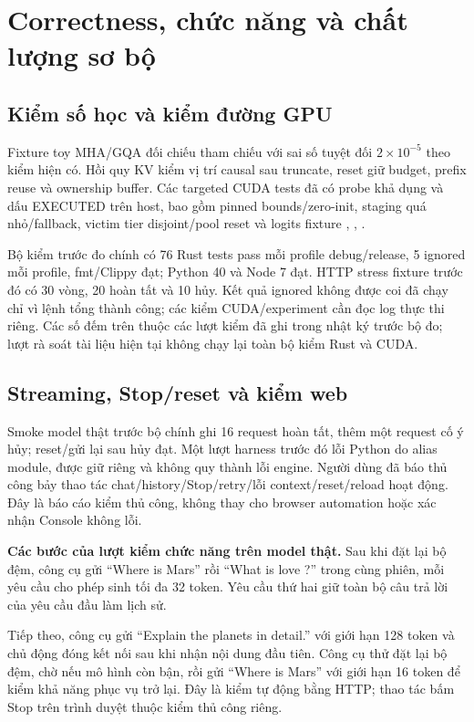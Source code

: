 \section{Correctness, chức năng và chất lượng sơ bộ}

\subsection{Kiểm số học và kiểm đường GPU}

Fixture toy MHA/GQA đối chiếu tham chiếu với sai số tuyệt đối $2\times10^{-5}$ theo kiểm hiện có. Hồi quy KV kiểm vị trí causal sau truncate, reset giữ budget, prefix reuse và ownership buffer. Các targeted CUDA tests đã có probe khả dụng và dấu EXECUTED trên host, bao gồm pinned bounds/zero-init, staging quá nhỏ/fallback, victim tier disjoint/pool reset và logits fixture \cite{moe_tierengine_arch}, \cite{exp_ram_guard_i5}, \cite{moe_progress_matrix}.

Bộ kiểm trước đo chính có 76 Rust tests pass mỗi profile debug/release, 5 ignored mỗi profile, fmt/Clippy đạt; Python 40 và Node 7 đạt. HTTP stress fixture trước đó có 30 vòng, 20 hoàn tất và 10 hủy. Kết quả ignored không được coi đã chạy chỉ vì lệnh tổng thành công; các kiểm CUDA/experiment cần đọc log thực thi riêng. Các số đếm trên thuộc các lượt kiểm đã ghi trong nhật ký trước bộ đo; lượt rà soát tài liệu hiện tại không chạy lại toàn bộ kiểm Rust và CUDA.

\subsection{Streaming, Stop/reset và kiểm web}

Smoke model thật trước bộ chính ghi 16 request hoàn tất, thêm một request cố ý hủy; reset/gửi lại sau hủy đạt. Một lượt harness trước đó lỗi Python do alias module, được giữ riêng và không quy thành lỗi engine. Người dùng đã báo thủ công bảy thao tác chat/history/Stop/retry/lỗi context/reset/reload hoạt động. Đây là báo cáo kiểm thủ công, không thay cho browser automation hoặc xác nhận Console không lỗi.

\textbf{Các bước của lượt kiểm chức năng trên model thật.} Sau khi đặt lại bộ đệm, công cụ gửi “Where is Mars” rồi “What is love ?” trong cùng phiên, mỗi yêu cầu cho phép sinh tối đa 32 token. Yêu cầu thứ hai giữ toàn bộ câu trả lời của yêu cầu đầu làm lịch sử.

Tiếp theo, công cụ gửi “Explain the planets in detail.” với giới hạn 128 token và chủ động đóng kết nối sau khi nhận nội dung đầu tiên. Công cụ thử đặt lại bộ đệm, chờ nếu mô hình còn bận, rồi gửi “Where is Mars” với giới hạn 16 token để kiểm khả năng phục vụ trở lại. Đây là kiểm tự động bằng HTTP; thao tác bấm Stop trên trình duyệt thuộc kiểm thủ công riêng.

